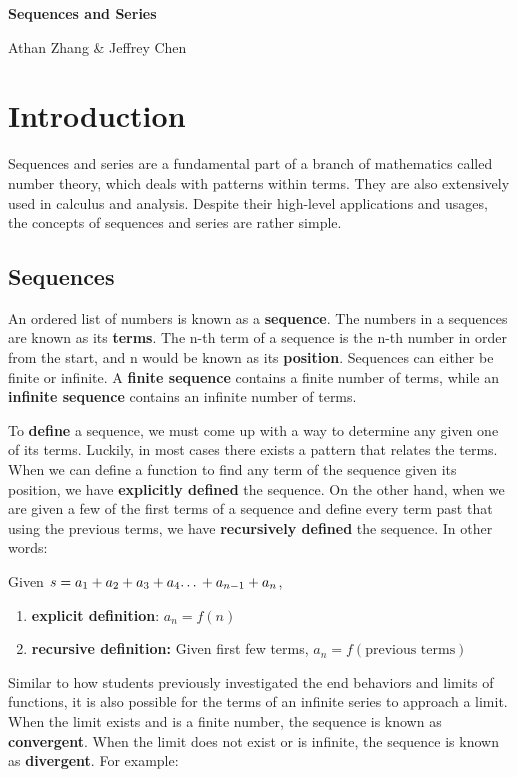 \documentclass[11pt]{article}
\begin{document}
\textbf{\Huge Sequences and Series}

Athan Zhang \& Jeffrey Chen

\section{Introduction}

Sequences and series are a fundamental part of a branch of mathematics called number theory, which deals with patterns within terms. They are also extensively used in calculus and analysis. Despite their high-level applications and usages, the concepts of sequences and series are rather simple.

\subsection{Sequences}
An ordered list of numbers is known as a \textbf{sequence}. The numbers in a sequences are known as its \textbf{terms}. The n-th term of a sequence is the n-th number in order from the start, and n would be known as its \textbf{position}. Sequences can either be finite or infinite. A \textbf{finite sequence} contains a finite number of terms, while an \textbf{infinite sequence} contains an infinite number of terms.

To \textbf{define} a sequence, we must come up with a way to determine any given one of its terms. Luckily, in most cases there exists a pattern that relates the terms.  When we can define a function to find any term of the sequence given its position, we have \textbf{explicitly defined} the sequence. On the other hand, when we are given a few of the first terms of a sequence and define every term past that using the previous terms, we have \textbf{recursively defined} the sequence. In other words:

Given $s = a_1 + a_2 + a_3 + a_4 \text{\dots} + a_{n-1} + a_n $,
\begin{center}
    \begin{enumerate}
    \item \textbf{explicit definition}: $a_n = f(n)$
    \item \textbf{recursive definition:} Given first few terms, $a_n = f(\text{previous terms})$
\end{enumerate}
\end{center}

Similar to how students previously investigated the end behaviors and limits of functions, it is also possible for the terms of an infinite series to approach a limit. When the limit exists and is a finite number, the sequence is known as \textbf{convergent}. When the limit does not exist or is infinite, the sequence is known as \textbf{divergent}. For example: 
\end{document}
